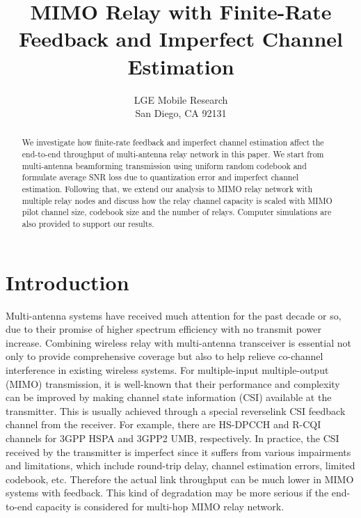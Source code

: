 \documentclass[10pt,fleqn, twocolumn]{IEEEtran}
\title{MIMO Relay with Finite-Rate Feedback and Imperfect Channel Estimation}
\author{LGE Mobile Research\\San Diego, CA 92131}
\date{}
\begin{document}
\maketitle
\begin{abstract}\small
We investigate how finite-rate feedback and imperfect channel
estimation affect the end-to-end throughput of multi-antenna relay
network in this paper. We start from multi-antenna beamforming
transmission using uniform random codebook and formulate average
SNR loss due to quantization error and imperfect channel
estimation. Following that, we extend our analysis to MIMO relay
network with multiple relay nodes and discuss how the relay
channel capacity is scaled with MIMO pilot channel size, codebook
size and the number of relays. Computer simulations are also
provided to support our results.
\end{abstract}

\section{Introduction}
Multi-antenna systems have received much attention for the past
decade or so, due to their promise of higher spectrum efficiency
with no transmit power increase. Combining wireless relay with
multi-antenna transceiver is essential not only to provide
comprehensive coverage but also to help relieve co-channel
interference in existing wireless systems. For multiple-input
multiple-output (MIMO) transmission, it is well-known that their
performance and complexity can be improved by making channel state
information (CSI) available at the transmitter. This is usually
achieved through a special reverselink CSI feedback channel from
the receiver. For example, there are HS-DPCCH and R-CQI channels
for 3GPP HSPA and 3GPP2 UMB, respectively. In practice, the CSI
received by the transmitter is imperfect since it suffers from
various impairments and limitations, which include round-trip
delay, channel estimation errors, limited codebook, etc. Therefore
the actual link throughput can be much lower in MIMO systems with
feedback. This kind of degradation may be more serious if the
end-to-end capacity is considered for multi-hop MIMO relay
network.
\end{document}
